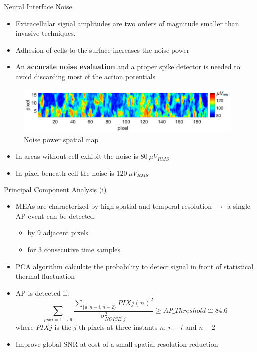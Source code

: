 \documentclass{beamer}
\begin{document}
\begin{frame}{Neural Interface Noise}
\begin{itemize}
    \item Extracellular signal amplitudes are two orders of magnitude smaller than invasive techniques.
    \item Adhesion of cells to the surface increases the noise power
    \item An \textbf{accurate noise evaluation} and a proper spike detector is needed to avoid discarding most of the action potentials
\end{itemize}

\begin{figure}
    \centering    
    \vspace{-0.5cm}
    \includegraphics[width=11cm]{noise.png}
    \vspace{-0.8cm}
    \caption{Noise power spatial map}
\end{figure}
\vspace{-0.5cm}
\begin{itemize}
    \item In areas without cell exhibit the noise is $ 80 \: \mu V_{RMS}$ 
    \item In pixel beneath cell the noise is $ 120 \: \mu V_{RMS}$ 
\end{itemize}
\end{frame}

\begin{frame}{Principal Component Analysis (i)}
\begin{itemize}
    \item MEAs are characterized by high spatial and temporal resolution $\xrightarrow{}$ a single AP event can be detected:
    \begin{itemize}
        \item by 9 adjacent pixels
        \item for 3 consecutive time samples
    \end{itemize}
    \item PCA algorithm calculate the probability to detect signal in front of statistical thermal fluctuation
    \item AP is detected if:
    \begin{equation}
        \sum_{pixj=1\xrightarrow{}9} \frac{\sum_{ \{ n,n-i,n-2 \} } PIXj (n)^2 }{\sigma_{NOISE,j}^2} \geq AP\_Threshold \cong 84.6
    \end{equation}
    where $PIXj$ is the $j$-th pixels at three instants $n$, $n-i$ and $n-2$
    \item Improve global SNR at cost of a small spatial resolution reduction
\end{itemize}
\end{frame}
\end{document}

